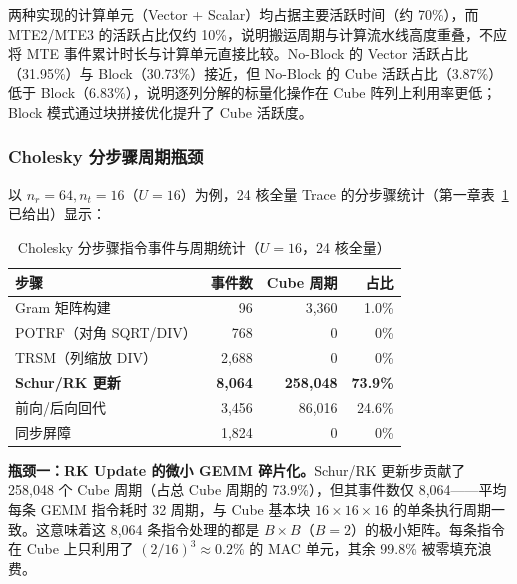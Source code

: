 \documentclass{CjC}
\begin{document}
    两种实现的计算单元（Vector + Scalar）均占据主要活跃时间（约 70\%），而 MTE2/MTE3
    的活跃占比仅约 10\%，说明搬运周期与计算流水线高度重叠，不应将 MTE
    事件累计时长与计算单元直接比较。No-Block 的 Vector 活跃占比（31.95\%）与 Block（30.73\%）接近，但
    No-Block 的 Cube 活跃占比（3.87\%）低于 Block（6.83\%），说明逐列分解的标量化操作在
    Cube 阵列上利用率更低；Block 模式通过块拼接优化提升了 Cube 活跃度。

    \subsubsection{Cholesky 分步骤周期瓶颈}

    以 $n_{r}=64,n_{t}=16$（$U=16$）为例，24 核全量 Trace 的分步骤统计（第一章表~\ref{tab:chol-step}
    已给出）显示：

    \begin{table}[H]
        \centering
        \caption{Cholesky 分步骤指令事件与周期统计（$U=16$，24 核全量）}
        \label{tab:chol-step}
        \begin{tabular}{l r r r}
            \toprule \textbf{步骤} & \textbf{事件数}   & \textbf{Cube 周期} & \textbf{占比}     \\
            \midrule Gram 矩阵构建   & 96             & 3,360            & 1.0\%           \\
            POTRF（对角 SQRT/DIV）   & 768            & 0                & 0\%             \\
            TRSM（列缩放 DIV）        & 2,688          & 0                & 0\%             \\
            \textbf{Schur/RK 更新} & \textbf{8,064} & \textbf{258,048} & \textbf{73.9\%} \\
            前向/后向回代              & 3,456          & 86,016           & 24.6\%          \\
            同步屏障                 & 1,824          & 0                & 0\%             \\
            \bottomrule
        \end{tabular}
    \end{table}

    \textbf{瓶颈一：RK Update 的微小 GEMM 碎片化。}Schur/RK 更新步贡献了 258,048
    个 Cube 周期（占总 Cube 周期的 73.9\%），但其事件数仅 8,064——平均每条 GEMM 指令耗时
    32 周期，与 Cube 基本块 $16\times16\times16$ 的单条执行周期一致。这意味着这 8,064
    条指令处理的都是 $B\times B$（$B=2$）的极小矩阵。每条指令在 Cube 上只利用了
    $(2/16)^{3}\approx 0.2\%$ 的 MAC 单元，其余 99.8\% 被零填充浪费。
\end{document}
